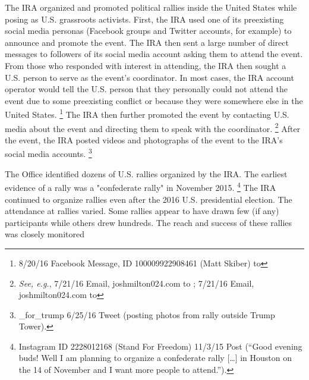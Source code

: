 The IRA organized and promoted political rallies inside the United States while posing as U.S. grassroots activists.
First, the IRA used one of its preexisting social media personas (Facebook groups and Twitter accounts, for example) to announce and promote the event.
The IRA then sent a large number of direct messages to followers of its social media account asking them to attend the event.
From those who responded with interest in attending, the IRA then sought a U.S. person to serve as the event's coordinator.
In most cases, the IRA account operator would tell the U.S. person that they personally could not attend the event due to some preexisting conflict or because they were somewhere else in the United States.%
\footnote{8/20/16 Facebook Message, ID 100009922908461 (Matt Skiber) to }
The IRA then further promoted the event by contacting U.S. media about the event and directing them to speak with the coordinator.%
\footnote{\textit{See, e.g.}, 7/21/16 Email, joshmilton024\@gmail.com to ;
7/21/16 Email, joshmilton024\@gmail.com to }
After the event, the IRA posted videos and photographs of the event to the IRA's  social media accounts.%
\footnote{\@march\_for\_trump 6/25/16 Tweet (posting photos from rally outside Trump Tower).}

The Office identified dozens of U.S. rallies organized by the IRA\null. The earliest evidence of a rally was a "confederate rally" in November 2015.%
\footnote{Instagram ID 2228012168 (Stand For Freedom) 11/3/15 Post (``Good evening buds!
Well I am planning to organize a confederate rally [\dots] in Houston on the 14 of November and I want more people to attend.'').}
The IRA continued to organize rallies even after the 2016 U.S. presidential election.
The attendance at rallies varied.
Some rallies appear to have drawn few (if any) participants while others drew hundreds.
The reach and success of these rallies was closely monitored 

